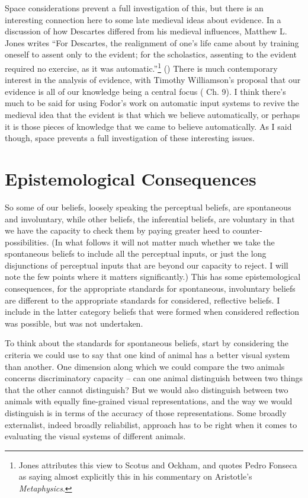 \documentclass[
  10pt,
  letterpaper,
  DIV=11,
  numbers=noendperiod,
  twoside]{scrartcl}
\begin{document}
Space considerations prevent a full investigation of this, but there is
an interesting connection here to some late medieval ideas about
evidence. In a discussion of how Descartes differed from his medieval
influences, Matthew L. Jones writes ``For Descartes, the realignment of
one's life came about by training oneself to assent only to the evident;
for the scholastics, assenting to the evident required no exercise, as
it was automatic.''\footnote{Jones attributes this view to Scotus and
  Ockham, and quotes Pedro Fonseca as saying almost explicitly this in
  his commentary on Aristotle's \emph{Metaphysics}.}
() There is much contemporary
interest in the analysis of evidence, with Timothy Williamson's proposal
that our evidence is all of our knowledge being a central focus
( Ch. 9). I think
there's much to be said for using Fodor's work on automatic input
systems to revive the medieval idea that the evident is that which we
believe automatically, or perhaps it is those pieces of knowledge that
we came to believe automatically. As I said though, space prevents a
full investigation of these interesting issues.

\section{Epistemological
Consequences}\label{epistemological-consequences}

So some of our beliefs, loosely speaking the perceptual beliefs, are
spontaneous and involuntary, while other beliefs, the inferential
beliefs, are voluntary in that we have the capacity to check them by
paying greater heed to counter-possibilities. (In what follows it will
not matter much whether we take the spontaneous beliefs to include all
the perceptual inputs, or just the long disjunctions of perceptual
inputs that are beyond our capacity to reject. I will note the few
points where it matters significantly.) This has some epistemological
consequences, for the appropriate standards for spontaneous, involuntary
beliefs are different to the appropriate standards for considered,
reflective beliefs. I include in the latter category beliefs that were
formed when considered reflection was possible, but was not undertaken.

To think about the standards for spontaneous beliefs, start by
considering the criteria we could use to say that one kind of animal has
a better visual system than another. One dimension along which we could
compare the two animals concerns discriminatory capacity -- can one
animal distinguish between two things that the other cannot distinguish?
But we would also distinguish between two animals with equally
fine-grained visual representations, and the way we would distinguish is
in terms of the accuracy of those representations. Some broadly
externalist, indeed broadly reliabilist, approach has to be right when
it comes to evaluating the visual systems of different animals.
\end{document}
